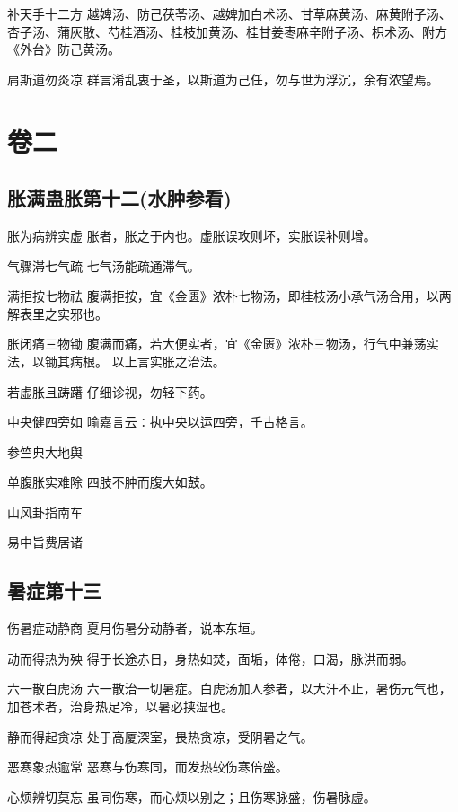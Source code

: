 \documentclass[a4paper,12pt,UTF8,twoside]{ctexbook}
\begin{document}
    补天手十二方
    越婢汤、防己茯苓汤、越婢加白术汤、甘草麻黄汤、麻黄附子汤、杏子汤、蒲灰散、芍桂酒汤、桂枝加黄汤、桂甘姜枣麻辛附子汤、枳术汤、附方《外台》防己黄汤。
    
    肩斯道勿炎凉
    群言淆乱衷于圣，以斯道为己任，勿与世为浮沉，余有浓望焉。
    
    
    
    \part{卷二}
    \chapter{胀满蛊胀第十二(水肿参看)} 

    胀为病辨实虚
    胀者，胀之于内也。虚胀误攻则坏，实胀误补则增。
    
    气骤滞七气疏
    七气汤能疏通滞气。
    
    满拒按七物祛
    腹满拒按，宜《金匮》浓朴七物汤，即桂枝汤小承气汤合用，以两解表里之实邪也。
    
    胀闭痛三物锄
    腹满而痛，若大便实者，宜《金匮》浓朴三物汤，行气中兼荡实法，以锄其病根。
    以上言实胀之治法。
    
    若虚胀且踌躇
    仔细诊视，勿轻下药。
    
    中央健四旁如
    喻嘉言云∶执中央以运四旁，千古格言。
    
    参竺典大地舆
    
    单腹胀实难除
    四肢不肿而腹大如鼓。
    
    山风卦指南车
    
    易中旨费居诸
    
    \chapter{暑症第十三}
    
    伤暑症动静商
    夏月伤暑分动静者，说本东垣。
    
    动而得热为殃
    得于长途赤日，身热如焚，面垢，体倦，口渴，脉洪而弱。
    
    六一散白虎汤
    六一散治一切暑症。白虎汤加人参者，以大汗不止，暑伤元气也，加苍术者，治身热足冷，以暑必挟湿也。
    
    静而得起贪凉
    处于高厦深室，畏热贪凉，受阴暑之气。
    
    恶寒象热逾常
    恶寒与伤寒同，而发热较伤寒倍盛。
    
    心烦辨切莫忘
    虽同伤寒，而心烦以别之；且伤寒脉盛，伤暑脉虚。
    
\end{document}

